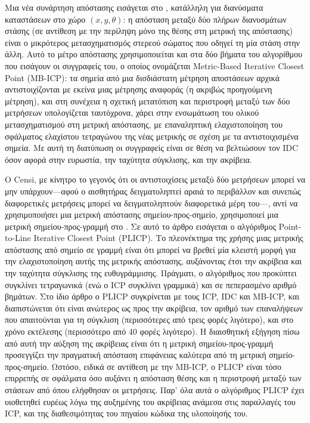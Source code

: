 Μια νέα συνάρτηση απόστασης εισάγεται στο \cite{Minguezb}, κατάλληλη για
διανύσματα καταστάσεων στο χώρο $(x,y,\theta)$: η απόσταση μεταξύ δύο πλήρων
διανυσμάτων στάσης (σε αντίθεση με την περίληψη μόνο της θέσης στη μετρική της
απόστασης) είναι ο μικρότερος μετασχηματισμός στερεού σώματος που οδηγεί τη μία
στάση στην άλλη. Αυτό το μέτρο απόστασης χρησιμοποιείται και στα δύο βήματα του
αλγορίθμου που εισάγουν οι συγγραφείς του, ο οποίος ονομάζεται Metric-Based
Iterative Closest Point (MB-ICP): τα σημεία από μια δισδιάστατη μέτρηση
αποστάσεων αρχικά αντιστοιχίζονται με εκείνα μιας μέτρησης αναφοράς (η ακριβώς
προηγούμενη μέτρηση), και στη συνέχεια η σχετική μετατόπιση και περιστροφή
μεταξύ των δύο μετρήσεων υπολογίζεται ταυτόχρονα, χάρει στην ενσωμάτωση του
ολικού μετασχηματισμού στη μετρική απόστασης, με επαναληπτική ελαχιστοποίηση
του σφάλματος ελαχίστου τετραγώνου της νέας μετρικής σε σχέση με τα
αντιστοιχισμένα σημεία. Με αυτή τη διατύπωση οι συγγραφείς είναι σε θέση να
βελτιώσουν τον IDC όσον αφορά στην ευρωστία, την ταχύτητα σύγκλισης, και την
ακρίβεια.

O Censi, με κίνητρο το γεγονός ότι οι αντιστοιχίσεις μεταξύ δύο μετρήσεων
μπορεί να μην υπάρχουν---αφού ο αισθητήρας δειγματοληπτεί αραιά το περιβάλλον
και συνεπώς διαφορετικές μετρήσεις μπορεί να δειγματοληπτούν διαφορετικά μέρη
του---, αντί να χρησιμοποιήσει μια μετρική απόστασης σημείου-προς-σημείο,
χρησιμοποιεί μια μετρική σημείου-προς-γραμμή στο \cite{Censi2008a}. Σε αυτό το
άρθρο εισάγεται ο αλγόριθμος Point-to-Line Iterative Closest Point (PLICP). Το
πλεονέκτημα της χρήσης μιας μετρικής απόστασης από σημείο σε γραμμή είναι ότι
μπορεί να βρεθεί μία κλειστή μορφή για την ελαχιστοποίηση αυτής της μετρικής
απόστασης, αυξάνοντας έτσι την ακρίβεια και την ταχύτητα σύγκλισης της
ευθυγράμμισης. Πράγματι, ο αλγόριθμος που προκύπτει συγκλίνει τετραγωνικά (ενώ
ο ICP συγκλίνει γραμμικά) και σε πεπερασμένο αριθμό βημάτων. Στο ίδιο άρθρο ο
PLICP συγκρίνεται με τους ICP, IDC και MB-ICP, και διαπιστώνεται ότι είναι
ανώτερος ως προς την ακρίβεια, τον αριθμό των επαναλήψεων που απαιτούνται για
τη σύγκλιση (περισσότερες από τρεις φορές λιγότερο), και στο χρόνο εκτέλεσης
(περισσότερο από 40 φορές λιγότερο). Η διαισθητική εξήγηση πίσω από αυτή την
αύξηση της ακρίβειας είναι ότι η μετρική σημείου-προς-γραμμή προσεγγίζει την
πραγματική απόσταση επιφάνειας καλύτερα από τη μετρική σημείο-προς-σημείο.
Ωστόσο, ειδικά σε αντίθεση με την MB-ICP, ο PLICP είναι τόσο επιρρεπής σε
σφάλματα όσο αυξάνει η απόσταση θέσης και η περιστροφή μεταξύ των στάσεων από
όπου ελήφθησαν οι μετρήσεις. Παρ' όλα αυτά ο αλγόριθμος PLICP έχει υιοθετηθεί
ευρέως λόγω της αυξημένης του ακρίβειας ανάμεσα στις παραλλαγές του ICP, και
της διαθεσιμότητας του πηγαίου κώδικα της υλοποίησής του.

